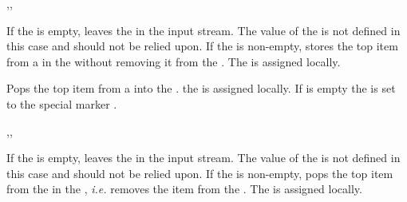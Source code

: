 \documentclass[oneside]{book}
\begin{document}
\begin{function}{\SeqGetT,\SeqGetF,\SeqGetTF}
\begin{syntax}
   
   
    
\end{syntax}
If the  is empty, leaves the  in the
input stream.  The value of the  is
not defined in this case and should not be relied upon.  If the
 is non-empty, stores the top item from a
 in the  without removing it from
the . The  is assigned locally.
\begin{demohigh}
\SeqSetFromClist {}
\SeqGetTF \lTmpaSeq {} {}
\end{demohigh}
\end{function}

\begin{function}{\SeqPop}
\begin{syntax}
  
\end{syntax}
Pops the top item from a  into the
. the  is assigned locally.
If  is empty the  is set to
the special marker .
\begin{demohigh}
\SeqSetFromClist {}
\SeqPop \lTmpaSeq \lTmpaTl
\SeqVarJoin \lTmpaSeq {,}
\end{demohigh}
\end{function}

\begin{function}{\SeqPopT,\SeqPopF,\SeqPopTF}
\begin{syntax}
   
   
    
\end{syntax}
If the  is empty, leaves the  in the
input stream.  The value of the  is
not defined in this case and should not be relied upon.  If the
 is non-empty, pops the top item from the 
in the , \emph{i.e.} removes the item from the
. The  is assigned locally.
\begin{demohigh}
\SeqPopTF \cEmptySeq {} {}
\end{demohigh}
\end{function}
\end{document}
